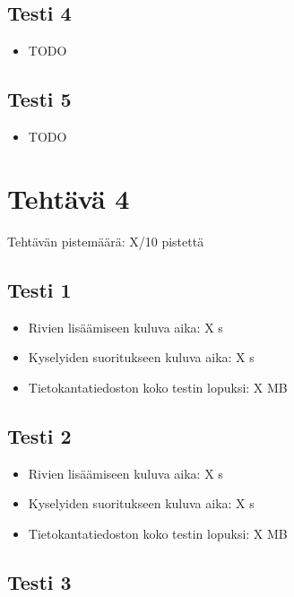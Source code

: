 \documentclass[a4paper,11pt]{article}
\begin{document}
\subsection*{Testi 4}

\begin{itemize}
\item TODO
\end{itemize}

\subsection*{Testi 5}

\begin{itemize}
\item TODO
\end{itemize}

\section*{Tehtävä 4}

Tehtävän pistemäärä: X/10 pistettä

\subsection*{Testi 1}

\begin{itemize}
\item Rivien lisäämiseen kuluva aika: X s
\item Kyselyiden suoritukseen kuluva aika: X s
\item Tietokantatiedoston koko testin lopuksi: X MB
\end{itemize}

\subsection*{Testi 2}

\begin{itemize}
\item Rivien lisäämiseen kuluva aika: X s
\item Kyselyiden suoritukseen kuluva aika: X s
\item Tietokantatiedoston koko testin lopuksi: X MB
\end{itemize}

\subsection*{Testi 3}
\end{document}
